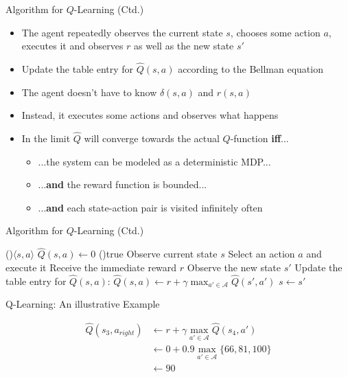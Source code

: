 \begin{frame}{Algorithm for $Q$-Learning (Ctd.)}{}
	\begin{itemize}
		\item The agent repeatedly observes the current state $s$, chooses some action $a$, executes it and
			observes $r$ as well as the new state $s'$
		\item Update the table entry for $\widehat{Q}(s, a)$ according to the Bellman equation
		\item The agent doesn't have to know $\delta(s, a)$ and $r(s, a)$
		\item Instead, it executes some actions and observes what happens
		\item In the limit $\widehat{Q}$ will converge towards the actual $Q$-function \textbf{iff}...
		\begin{itemize}
			\item ...the system can be modeled as a deterministic MDP...
			\item ...\textbf{and} the reward function is bounded...
			\item ...\textbf{and} each state-action pair is visited infinitely often
		\end{itemize}
	\end{itemize}
\end{frame}


\begin{frame}{Algorithm for $Q$-Learning (Ctd.)}{}
	\begin{algorithm}[H]
		\footnotesize
		\DontPrintSemicolon
 		\ForEach(){$\langle s, a \rangle$}{
 			$\widehat{Q}(s, a) \longleftarrow 0$ \;
 		}
		\While(){true}{
  			Observe current state $s$\;
  			Select an action $a$ and execute it\;
  			Receive the immediate reward $r$\;
  			Observe the new state $s'$\;
  			Update the table entry for $\widehat{Q}(s, a)$:
  				$\widehat{Q}(s, a) \longleftarrow r + \gamma \max_{a' \in \mathcal{A}} \widehat{Q}(s', a')$\;
  			$s \longleftarrow s'$\;
 		}
 		\caption{Learning the $Q$-function}
	\end{algorithm}
\end{frame}


\begin{frame}{Q-Learning: An illustrative Example}{}
	
	\vspace*{-2mm}
	\begin{align*}
		\widehat{Q}(s_3, a_{right}) 	&\longleftarrow r + \gamma \max_{a' \in \mathcal{A}} \widehat{Q}(s_4, a') \\
								&\longleftarrow 0 + 0.9 \max_{a' \in \mathcal{A}}\{66,81,100\} \\
								&\longleftarrow 90
	\end{align*}
\end{frame}



